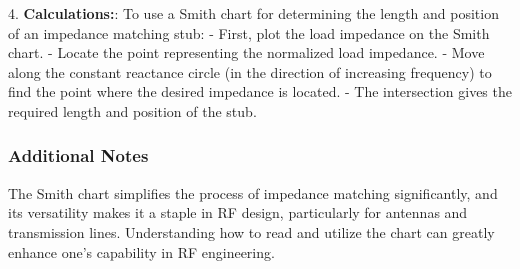 4. \textbf{Calculations:}: To use a Smith chart for determining the length and position of an impedance matching stub:
   - First, plot the load impedance on the Smith chart.
   - Locate the point representing the normalized load impedance.
   - Move along the constant reactance circle (in the direction of increasing frequency) to find the point where the desired impedance is located.
   - The intersection gives the required length and position of the stub.

\subsubsection{Additional Notes}

The Smith chart simplifies the process of impedance matching significantly, and its versatility makes it a staple in RF design, particularly for antennas and transmission lines. Understanding how to read and utilize the chart can greatly enhance one’s capability in RF engineering.

